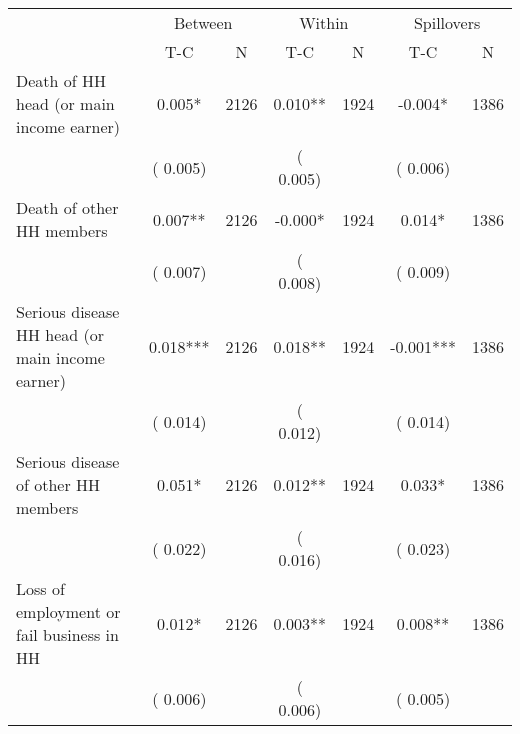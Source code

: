 
\begin{tabular}{l*{6}{c}}\hline&\multicolumn{2}{c}{Between}&\multicolumn{2}{c}{Within}&\multicolumn{2}{c}{Spillovers} \\ \cmidrule(r){2-3}\cmidrule(l){4-5}\cmidrule(l){6-7} & {T-C} & {N} & {T-C} & {N}  & {T-C}  & {N}  \\ \midrule
Death of HH head (or main income earner)        &              0.005*      &       2126       &              0.010**      &       1924       &             -0.004*      &       1386       \\
                       &       (       0.005)            &                               &       (       0.005)            &                               &       (       0.006)            &                               \\
Death of other HH members        &              0.007**      &       2126       &             -0.000*      &       1924       &              0.014*      &       1386       \\
                       &       (       0.007)            &                               &       (       0.008)            &                               &       (       0.009)            &                               \\
Serious disease HH head (or main income earner)        &              0.018***      &       2126       &              0.018**      &       1924       &             -0.001***      &       1386       \\
                       &       (       0.014)            &                               &       (       0.012)            &                               &       (       0.014)            &                               \\
Serious disease of other HH members        &              0.051*      &       2126       &              0.012**      &       1924       &              0.033*      &       1386       \\
                       &       (       0.022)            &                               &       (       0.016)            &                               &       (       0.023)            &                               \\
Loss of employment or fail business in HH        &              0.012*      &       2126       &              0.003**      &       1924       &              0.008**      &       1386       \\
                       &       (       0.006)            &                               &       (       0.006)            &                               &       (       0.005)            &                               \\

\end{tabular}
